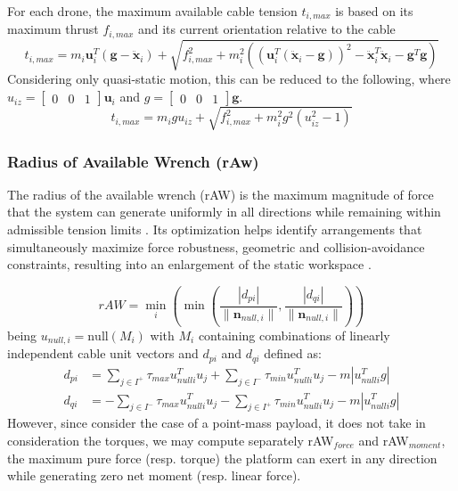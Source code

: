For each drone, the maximum available cable tension $t_{i, max}$ is based on its maximum thrust $f_{i, max}$ and its current orientation relative to the cable \cite{erskine_wrench_2019}
\begin{equation}
t_{i, max} = m_i \boldsymbol{u}_i^T (\boldsymbol{g} - \ddot{\boldsymbol{x}}_i) + \sqrt{f_{i, max}^2 + m_i^2 \left( \left( \boldsymbol{u}_i^T (\ddot{\boldsymbol{x}}_i - \boldsymbol{g}) \right)^2 - \ddot{\boldsymbol{x}}_i^T \ddot{\boldsymbol{x}}_i - \boldsymbol{g}^T \boldsymbol{g} \right)}
\end{equation}
Considering only quasi-static motion, this can be reduced to the following, where $u_{iz} = \begin{bmatrix} 0 & 0 & 1 \end{bmatrix} \boldsymbol{u}_i$ and $g = \begin{bmatrix} 0 & 0 & 1 \end{bmatrix} \boldsymbol{g}$.
\begin{equation}
    t_{i, max} = m_igu_{iz} + \sqrt{f_{i, max}^2 + m_i^2 g^2 \left(u_{iz}^2 - 1 \right)}
\end{equation}

\subsubsection{Radius of Available Wrench (rAw)}
The radius of the available wrench (rAW) is the maximum magnitude of force that the system can generate uniformly in all directions while remaining within admissible tension limits \cite{jamshidifar_static_2020}. Its optimization helps identify arrangements that simultaneously maximize force robustness, geometric and collision-avoidance constraints, resulting into an enlargement of the static workspace \cite{jamshidifar_static_2020}.

\begin{equation}
    rAW = \min_i \left( \min \left(\frac{|d_{pi}|}{\|\mathbf{n}_{null, i} \|}, \frac{|d_{qi}|}{\|\mathbf{n}_{null, i} \|} \right)\right)
\end{equation}
being $u_{null, i} = \text{null}(M_i)$ with $M_i$ containing combinations of linearly independent cable unit vectors and $d_{pi}$ and $d_{qi}$ defined as:
\begin{equation}
    \begin{aligned}
        d_{pi} &= \sum_{j \in I^+} \tau_{max} u_{nulli}^T u_j + \sum_{j \in I^-} \tau_{min} u_{nulli}^T u_j - m |u_{nulli}^T g| \\
        d_{qi} &= -\sum_{j \in I^-} \tau_{max} u_{nulli}^T u_j - \sum_{j \in I^+} \tau_{min} u_{nulli}^T u_j - m |u_{nulli}^T g|
    \end{aligned}
\end{equation}
However, since \cite{jamshidifar_static_2020} consider the case of a point-mass payload, it does not take in consideration the torques, we may compute separately rAW$_{force}$ and rAW$_{moment}$, the maximum pure force (resp. torque) the platform can exert in any direction while generating zero net moment (resp. linear force).


